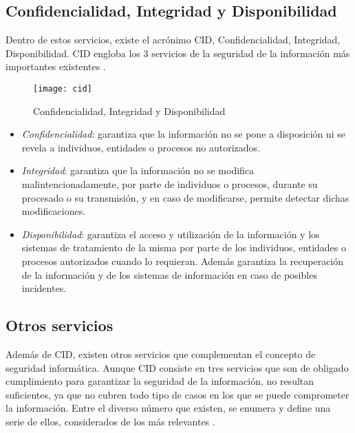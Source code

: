 \subsection[CID]{Confidencialidad, Integridad y Disponibilidad}

Dentro de estos servicios, existe el acrónimo CID, Confidencialidad, Integridad, Disponibilidad. CID engloba los 3 servicios de la seguridad de la información más importantes existentes \cite{iso-27000}.

\begin{figure}[H]
	\centering
	\texttt{[image: cid]}
	\caption{Confidencialidad, Integridad y Disponibilidad}
	\label{fig:cid}
\end{figure}

\begin{itemize}
	\item \emph{Confidencialidad}: garantiza que la información no se pone a disposición ni se revela  a individuos, entidades o procesos no autorizados.
	\item \emph{Integridad}: garantiza que la información no se modifica malintencionadamente, por parte de individuos o procesos, durante su procesado o su transmisión, y en caso de modificarse, permite detectar dichas modificaciones.
	\item \emph{Disponibilidad}: garantiza el acceso y utilización de la información y los sistemas de tratamiento de la misma por parte de los individuos, entidades o procesos autorizados cuando lo requieran. Además garantiza la recuperación de la información y de los sistemas de información en caso de posibles incidentes.
\end{itemize}

\subsection{Otros servicios}

Además de CID, existen otros servicios que complementan el concepto de seguridad informática. Aunque CID consiste en tres servicios que son de obligado cumplimiento para garantizar la seguridad de la información, no resultan suficientes, ya que no cubren todo tipo de casos en los que se puede comprometer la información. Entre el diverso número  que existen, se enumera y define una serie de ellos, considerados de los más relevantes \cite{apuntes-isma}.

